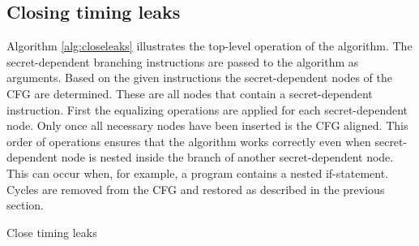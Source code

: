 \subsection{Closing timing leaks}
Algorithm \ref{alg:closeleaks} illustrates the top-level operation of the algorithm. 
The secret-dependent branching instructions are passed to the algorithm as arguments. 
Based on the given instructions the secret-dependent nodes of the CFG are determined. 
These are all nodes that contain a secret-dependent instruction. 
First the equalizing operations are applied for each secret-dependent node. 
Only once all necessary nodes have been inserted is the CFG aligned.
This order of operations ensures that the algorithm works correctly even when secret-dependent node is nested inside the branch of another secret-dependent node. 
This can occur when, for example, a program contains a nested if-statement. Cycles are removed from the CFG and restored as described in the previous section.


\begin{algorithm*}
    \SetAlgoLined
    \DontPrintSemicolon
    
    
    
    
    \caption{Close timing leaks}
    \label{alg:closeleaks}
\end{algorithm*}